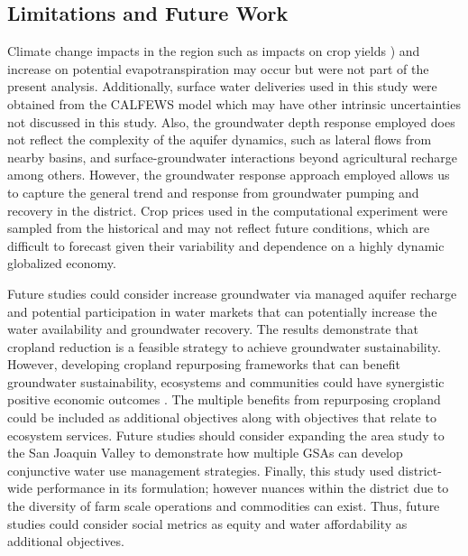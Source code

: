 \documentclass[a4paper,fleqn]{cas-sc}
\begin{document}
\subsection{Limitations and Future Work}

Climate change impacts in the region such as impacts on crop yields \citep{blanc_is_2017}) and increase on potential evapotranspiration \citep{mcevoy_projected_2020,vahmani_will_2022} may occur but were not part of the present analysis. Additionally, surface water deliveries used in this study were obtained from the CALFEWS model \citep{zeff_californias_2021} which may have other intrinsic uncertainties not discussed in this study. Also, the groundwater depth response employed does not reflect the complexity of the aquifer dynamics, such as lateral flows from nearby basins, and surface-groundwater interactions beyond agricultural recharge among others. However, the groundwater response approach employed allows us to capture the general trend and response from groundwater pumping and recovery in the district. Crop prices used in the computational experiment were sampled from the historical and may not reflect future conditions, which are difficult to forecast given their variability and dependence on a highly dynamic globalized economy. 

Future studies could consider increase groundwater via managed aquifer recharge \citep{alam_can_2020} and potential participation in water markets \citep{arellano-gonzalez_adaptive_2021,hanak_water_2019} that can potentially increase the water availability and groundwater recovery. The results demonstrate that cropland reduction is a feasible strategy to achieve groundwater sustainability. However, developing cropland repurposing frameworks that can benefit groundwater sustainability, ecosystems and communities could have synergistic positive economic outcomes \citep{biggs_landowner_2022,fernandez-bou_water_2023,espinoza_fallow_2023}. The multiple benefits from repurposing cropland could be included as additional objectives along with objectives that relate to ecosystem services. Future studies should consider expanding the area study to the San Joaquin Valley to demonstrate how multiple GSAs can develop conjunctive water use management strategies. Finally, this study used district-wide performance in its formulation; however nuances within the district due to the diversity of farm scale operations and commodities can exist. Thus, future studies could consider social metrics as equity and water affordability as additional objectives.  
\end{document}
